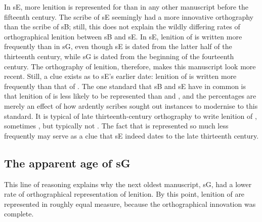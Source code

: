 In \gls{sE},  more lenition is represented for  than in any other manuscript before the fifteenth century. The scribe of \gls{sE} seemingly had a more innovative orthography than the scribe of \gls{sB}; still, this does not explain the wildly differing rates of orthographical lenition between \gls{sB} and \gls{sE}. In \gls{sE}, lenition of  is written more frequently than in \gls{sG}, even though \gls{sE} is dated from the latter half of the thirteenth century, while \gls{sG} is dated from the beginning of the fourteenth century. The orthography of lenition, therefore, makes this manuscript look more recent. Still, a clue exists as to \gls{sE}'s earlier date: lenition of  is written  more frequently than that of . The one standard that \gls{sB} and \gls{sE} have in common is that lenition of  is less likely to be represented than  and , and the percentages are merely an effect of how ardently scribes sought out instances to modernise to this standard. It is typical of late thirteenth-century orthography to write lenition of , sometimes , but typically not . The fact that  is represented so much less frequently may serve as a clue that \gls{sE} indeed dates to the late thirteenth century. 

\subsection{The apparent age of \gls{sG}}
\label{sec:apparent-age-glssg}

This line of reasoning explains why the next oldest manuscript, \gls{sG}, had a lower rate of orthographical representation of lenition. By this point, lenition of  are represented in roughly equal measure, because the orthographical innovation was complete. 

